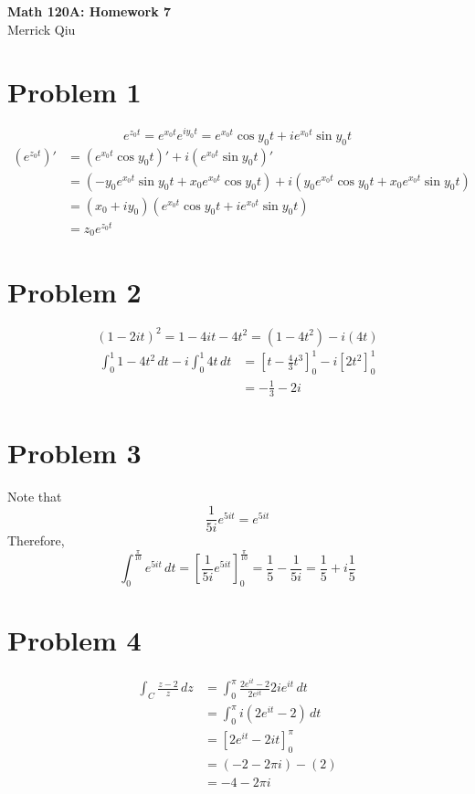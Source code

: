\documentclass{article}
\begin{document}
\begin{center}
	\huge{\bf Math 120A: Homework 7} \\
	Merrick Qiu
\end{center}
\section*{Problem 1}
\[
	e^{z_0t} = e^{x_0t}e^{iy_0t} = e^{x_0t}\cos y_0t + ie^{x_0t}\sin y_0 t
\]
\begin{align*}
	(e^{z_0t})' &= (e^{x_0t}\cos y_0t)' + i(e^{x_0t}\sin y_0 t)' \\
	&= (-y_0e^{x_0t}\sin y_0t + x_0e^{x_0t}\cos y_0t) + i(y_0e^{x_0t}\cos y_0 t + x_0e^{x_0t}\sin y_0 t) \\
	&= (x_0 + iy_0)(e^{x_0t}\cos y_0t + ie^{x_0t}\sin y_0t) \\
	&= z_0e^{z_0t}
\end{align*}
\newpage

\section*{Problem 2}
\[
	(1-2it)^2 = 1 - 4it -4t^2 = (1-4t^2) - i(4t)
\]
\begin{align*}
	\int_0^1 1-4t^2\, dt - i\int_0^1 4t\, dt &=
	\left[t - \frac{4}{3}t^3\right]_0^1 - i \left[2t^2\right]_0^1 \\
	&= -\frac{1}{3} - 2i
\end{align*}
\newpage 

\section*{Problem 3}
Note that
\[
	\frac{1}{5i}e^{5it} = e^{5it} 
\]
Therefore,
\[
	\int_0^\frac{\pi}{10} e^{5it} \,dt =
	\left[\frac{1}{5i}e^{5it}\right]_0^{\frac{\pi}{10}} =
	\frac{1}{5}- \frac{1}{5i} =
	\frac{1}{5} + i\frac{1}{5}
\]
\newpage 

\section*{Problem 4}
\begin{align*}
	\int_C \frac{z-2}{z}\,dz &=
	\int_0^\pi \frac{2e^{it}-2}{2e^{it}} 2ie^{it} \,dt \\
	&= \int_0^\pi i(2e^{it}-2) \,dt \\
	&= \left[2e^{it} -2it\right]_0^\pi \\
	&= (-2-2\pi i) - (2) \\
	&= -4-2\pi i
\end{align*}
\end{document}
